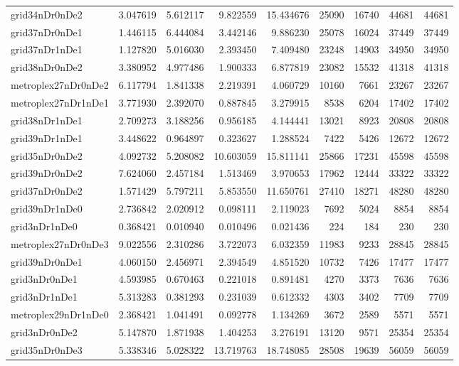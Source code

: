 \begin{longtable}{|l|r|r|r|r|r|r|r|r|}
grid34nDr0nDe2 & 3.047619 & 5.612117 & 9.822559 & 15.434676 & 25090 & 16740 & 44681 & 44681 \\
grid37nDr0nDe1 & 1.446115 & 6.444084 & 3.442146 & 9.886230 & 25078 & 16024 & 37449 & 37449 \\
grid37nDr1nDe1 & 1.127820 & 5.016030 & 2.393450 & 7.409480 & 23248 & 14903 & 34950 & 34950 \\
grid38nDr0nDe2 & 3.380952 & 4.977486 & 1.900333 & 6.877819 & 23082 & 15532 & 41318 & 41318 \\
metroplex27nDr0nDe2 & 6.117794 & 1.841338 & 2.219391 & 4.060729 & 10160 & 7661 & 23267 & 23267 \\
metroplex27nDr1nDe1 & 3.771930 & 2.392070 & 0.887845 & 3.279915 & 8538 & 6204 & 17402 & 17402 \\
grid38nDr1nDe1 & 2.709273 & 3.188256 & 0.956185 & 4.144441 & 13021 & 8923 & 20808 & 20808 \\
grid39nDr1nDe1 & 3.448622 & 0.964897 & 0.323627 & 1.288524 & 7422 & 5426 & 12672 & 12672 \\
grid35nDr0nDe2 & 4.092732 & 5.208082 & 10.603059 & 15.811141 & 25866 & 17231 & 45598 & 45598 \\
grid39nDr0nDe2 & 7.624060 & 2.457184 & 1.513469 & 3.970653 & 17962 & 12444 & 33322 & 33322 \\
grid37nDr0nDe2 & 1.571429 & 5.797211 & 5.853550 & 11.650761 & 27410 & 18271 & 48280 & 48280 \\
grid39nDr1nDe0 & 2.736842 & 2.020912 & 0.098111 & 2.119023 & 7692 & 5024 & 8854 & 8854 \\
grid3nDr1nDe0 & 0.368421 & 0.010940 & 0.010496 & 0.021436 & 224 & 184 & 230 & 230 \\
metroplex27nDr0nDe3 & 9.022556 & 2.310286 & 3.722073 & 6.032359 & 11983 & 9233 & 28845 & 28845 \\
grid39nDr0nDe1 & 4.060150 & 2.456971 & 2.394549 & 4.851520 & 10732 & 7426 & 17477 & 17477 \\
grid3nDr0nDe1 & 4.593985 & 0.670463 & 0.221018 & 0.891481 & 4270 & 3373 & 7636 & 7636 \\
grid3nDr1nDe1 & 5.313283 & 0.381293 & 0.231039 & 0.612332 & 4303 & 3402 & 7709 & 7709 \\
metroplex29nDr1nDe0 & 2.368421 & 1.041491 & 0.092778 & 1.134269 & 3672 & 2589 & 5571 & 5571 \\
grid3nDr0nDe2 & 5.147870 & 1.871938 & 1.404253 & 3.276191 & 13120 & 9571 & 25354 & 25354 \\
grid35nDr0nDe3 & 5.338346 & 5.028322 & 13.719763 & 18.748085 & 28508 & 19639 & 56059 & 56059 \\

\end{longtable}
